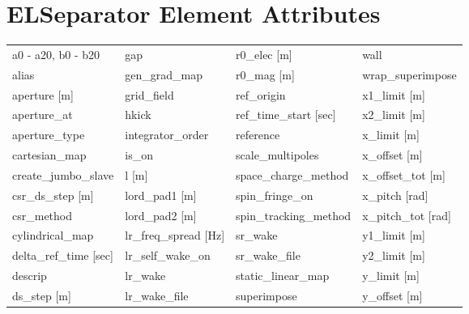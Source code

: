  \section{ELSeparator Element Attributes}
 \label{s:list.elseparator}
 
 \begin{tabular}{llll} \toprule
a0 - a20, b0 - b20               & gap                              & r0_elec [m]                      & wall                             \\
alias                            & gen_grad_map                     & r0_mag [m]                       & wrap_superimpose                 \\
aperture [m]                     & grid_field                       & ref_origin                       & x1_limit [m]                     \\
aperture_at                      & hkick                            & ref_time_start [sec]             & x2_limit [m]                     \\
aperture_type                    & integrator_order                 & reference                        & x_limit [m]                      \\
cartesian_map                    & is_on                            & scale_multipoles                 & x_offset [m]                     \\
create_jumbo_slave               & l [m]                            & space_charge_method              & x_offset_tot [m]                 \\
csr_ds_step [m]                  & lord_pad1 [m]                    & spin_fringe_on                   & x_pitch [rad]                    \\
csr_method                       & lord_pad2 [m]                    & spin_tracking_method             & x_pitch_tot [rad]                \\
cylindrical_map                  & lr_freq_spread [Hz]              & sr_wake                          & y1_limit [m]                     \\
delta_ref_time [sec]             & lr_self_wake_on                  & sr_wake_file                     & y2_limit [m]                     \\
descrip                          & lr_wake                          & static_linear_map                & y_limit [m]                      \\
ds_step [m]                      & lr_wake_file                     & superimpose                      & y_offset [m]                     \\

\end{tabular}

